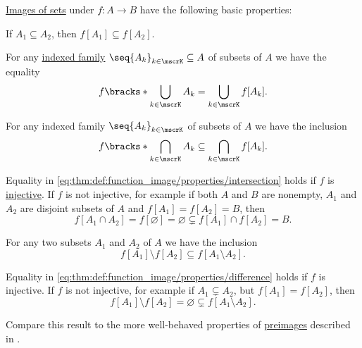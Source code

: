 \begin{proposition}\label{thm:def:function_image/properties}
  \hyperref[def:multi_valued_function/set_value]{Images of sets} under \( f: A \to B \) have the following basic properties:
  \begin{thmenum}
     If \( A_1 \subseteq A_2 \), then \( f[A_1] \subseteq f[A_2] \).

     For any \hyperref[def:cartesian_product/indexed_family]{indexed family} \( \seq{ A_k }_{k \in \mscrK} \subseteq A \) of subsets of \( A \) we have the equality
    \begin{equation}\label{eq:thm:def:function_image/properties/union}
      f\bracks*{ \bigcup_{k \in \mscrK} A_k } = \bigcup_{k \in \mscrK} f[A_k].
    \end{equation}

     For any indexed family \( \seq{ A_k }_{k \in \mscrK} \) of subsets of \( A \) we have the inclusion
    \begin{equation}\label{eq:thm:def:function_image/properties/intersection}
      f\bracks*{ \bigcap_{k \in \mscrK} A_k } \subseteq \bigcap_{k \in \mscrK} f[A_k].
    \end{equation}

    Equality in \eqref{eq:thm:def:function_image/properties/intersection} holds if \( f \) is \hyperref[def:function_invertibility/injective]{injective}. If \( f \) is not injective, for example if both \( A \) and \( B \) are nonempty, \( A_1 \) and \( A_2 \) are disjoint subsets of \( A \) and \( f[A_1] = f[A_2] = B \), then
    \begin{equation*}
      f[A_1 \cap A_2] = f[\varnothing] = \varnothing \subsetneq f[A_1] \cap f[A_2] = B.
    \end{equation*}

     For any two subsets \( A_1 \) and \( A_2 \) of \( A \) we have the inclusion
    \begin{equation}\label{eq:thm:def:function_image/properties/difference}
      f[A_1] \setminus f[A_2] \subseteq f[A_1 \setminus A_2].
    \end{equation}

    Equality in \eqref{eq:thm:def:function_image/properties/difference} holds if \( f \) is injective. If \( f \) is not injective, for example if \( A_1 \subsetneq A_2 \), but \( f[A_1] = f[A_2] \), then
    \begin{equation*}
      f[A_1] \setminus f[A_2] = \varnothing \subsetneq f[A_1 \setminus A_2].
    \end{equation*}
  \end{thmenum}

  Compare this result to the more well-behaved properties of \hyperref[thm:def:function/properties/preimage]{preimages} described in .
\end{proposition}
